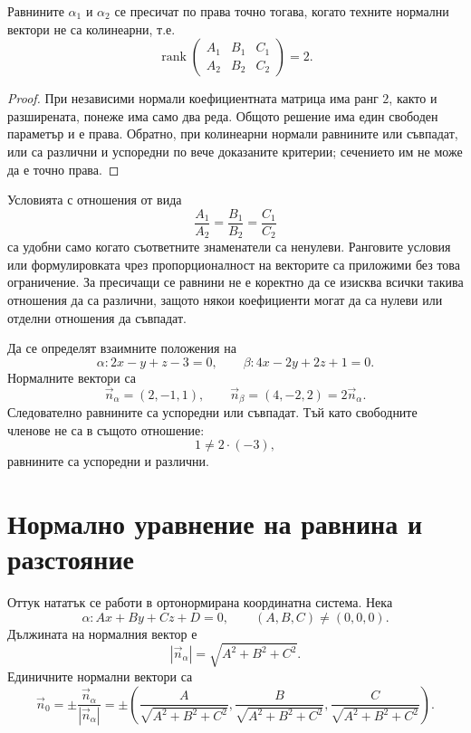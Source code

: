 \begin{prop}
Равнините $\alpha_1$ и $\alpha_2$ се пресичат по права точно тогава, когато техните нормални вектори не са колинеарни, т.е.
\[
\operatorname{rank}
\begin{pmatrix}
A_1&B_1&C_1\\
A_2&B_2&C_2
\end{pmatrix}=2.
\]
\end{prop}

\begin{proof}
При независими нормали коефициентната матрица има ранг $2$, както и разширената, понеже има само два реда. Общото решение има един свободен параметър и е права. Обратно, при колинеарни нормали равнините или съвпадат, или са различни и успоредни по вече доказаните критерии; сечението им не може да е точно права.
\end{proof}

\begin{supp}[Бележка]
Условията с отношения от вида
\[
\frac{A_1}{A_2}=\frac{B_1}{B_2}=\frac{C_1}{C_2}
\]
са удобни само когато съответните знаменатели са ненулеви. Ранговите условия или формулировката чрез пропорционалност на векторите са приложими без това ограничение. За пресичащи се равнини не е коректно да се изисква всички такива отношения да са различни, защото някои коефициенти могат да са нулеви или отделни отношения да съвпадат.
\end{supp}

\begin{example}
Да се определят взаимните положения на
\[
\alpha:2x-y+z-3=0,
\qquad
\beta:4x-2y+2z+1=0.
\]
Нормалните вектори са
\[
\vec n_\alpha=(2,-1,1),\qquad
\vec n_\beta=(4,-2,2)=2\vec n_\alpha.
\]
Следователно равнините са успоредни или съвпадат. Тъй като свободните членове не са в същото отношение:
\[
1\ne2\cdot(-3),
\]
равнините са успоредни и различни.
\end{example}

\section{Нормално уравнение на равнина и разстояние}\label{s:29.4}

Оттук нататък се работи в ортонормирана координатна система. Нека
\[
\alpha:Ax+By+Cz+D=0,\qquad (A,B,C)\ne(0,0,0).
\]
Дължината на нормалния вектор е
\[
|\vec n_\alpha|=\sqrt{A^2+B^2+C^2}.
\]
Единичните нормални вектори са
\[
\vec n_0=
\pm\frac{\vec n_\alpha}{|\vec n_\alpha|}
=
\pm\left(
\frac{A}{\sqrt{A^2+B^2+C^2}},
\frac{B}{\sqrt{A^2+B^2+C^2}},
\frac{C}{\sqrt{A^2+B^2+C^2}}
\right).
\]

